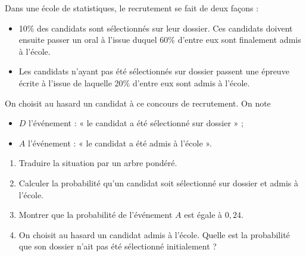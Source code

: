 \documentclass[11pt,fleqn, openany]{book} %
\begin{document}
\begin{exercise}[subtitle={(Métropole 2021)}]

Dans une école de statistiques, le recrutement se fait de deux façons : 
\begin{itemize}
\item 10\% des candidats sont sélectionnés sur leur dossier. Ces candidats doivent ensuite passer un oral à l'issue duquel 60\% d'entre eux sont finalement admis à l'école.
\item Les candidats n'ayant pas été sélectionnés sur dossier passent une épreuve écrite à l'issue de laquelle 20\% d'entre eux sont admis à l'école.
\end{itemize}
On choisit au hasard un candidat à ce concours de recrutement. On note
\begin{itemize}
\item $D$ l'événement : « le candidat a été sélectionné sur dossier » ;
\item $A$ l'événement : « le candidat a été admis à l'école ».
\end{itemize}
\begin{enumerate}
\item Traduire la situation par un arbre pondéré.
\item Calculer la probabilité qu'un candidat soit sélectionné sur dossier et admis à l'école.
\item Montrer que la probabilité de l'événement $A$ est égale à $0,24$.
\item On choisit au hasard un candidat admis à l'école. Quelle est la probabilité que son dossier n'ait pas été sélectionné initialement ?
\end{enumerate}\end{exercise}
\end{document}
